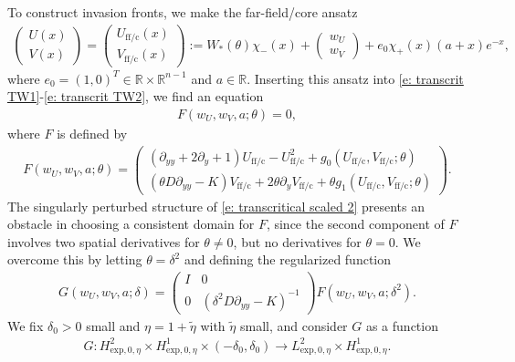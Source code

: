 \documentclass[11pt]{article}
\newcommand{\R}{\mathbb{R}}
\numberwithin{equation}{section}
\numberwithin{prop}{section}
\begin{document}
To construct invasion fronts, we make the far-field/core ansatz
\begin{align}
	\begin{pmatrix}
		U(x) \\ V(x) 
	\end{pmatrix} =
	\begin{pmatrix}
		U_\mathrm{ff/c} (x) \\  V_\mathrm{ff/c} (x)
	\end{pmatrix} :=
	W_*(\theta) \chi_- (x) + \begin{pmatrix} w_U \\ w_V \end{pmatrix} + e_0 \chi_+ (x) (a + x) e^{-x}, \label{e: transcrit ff core ansatz}
\end{align}
where $e_0 = (1, 0)^T \in \R\times \R^{n-1}$ and $a \in \R$. Inserting this ansatz into \eqref{e: transcrit TW1}-\eqref{e: transcrit TW2}, we find an equation
\begin{align}
	F (w_U, w_V, a; \theta) = 0, 
\end{align}
where $F$ is defined by
\begin{align}
	F (w_U, w_V, a; \theta) = \begin{pmatrix}
		(\partial_{yy} + 2 \partial_y + 1) U_\mathrm{ff/c} - U_\mathrm{ff/c}^2 + g_0 ( U_\mathrm{ff/c},  V_\mathrm{ff/c}; \theta) \\
		(\theta D \partial_{yy} - K)  V_\mathrm{ff/c} + 2 \theta \partial_y V_\mathrm{ff/c} + \theta g_1 ( U_\mathrm{ff/c},  V_\mathrm{ff/c}; \theta)
	\end{pmatrix}. 
\end{align}
The singularly perturbed structure of \eqref{e: transcritical scaled 2} presents an obstacle in choosing a consistent domain for $F$, since the second component of $F$ involves two spatial derivatives for $\theta \neq 0$, but no derivatives for $\theta = 0$. We overcome this by letting $\theta = \delta^2$ and defining the regularized function
\begin{align}
	G(w_U, w_V, a; \delta) = \begin{pmatrix}
		I & 0 \\ 0 & (\delta^2 D \partial_{yy} - K)^{-1} 
	\end{pmatrix}
	F (w_U, w_V, a; \delta^2). \label{e: transcrit G def}
\end{align}
We fix $\delta_0 > 0$ small and $\eta = 1 + \tilde{\eta}$ with $\tilde{\eta}$ small, and consider $G$ as a function
\begin{align}
	G : H^2_{\mathrm{exp}, 0, \eta} \times H^1_{\mathrm{exp}, 0, \eta} \times (-\delta_0, \delta_0) \to L^2_{\mathrm{exp}, 0, \eta} \times H^1_{\mathrm{exp}, 0, \eta}. 
\end{align}
\end{document}
